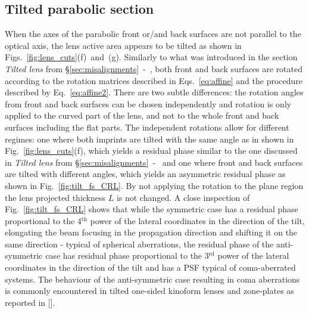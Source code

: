 \begin{refsection}
\subsection{Tilted parabolic section}

When the axes of the parabolic front or/and back surfaces are not parallel to the optical axis, the lens active area appears to be tilted as shown in Figs.~\ref{fig:lens_cuts}(f)~and~(g). Similarly to what was introduced in the section \textit{Tilted lens} from \S\ref{sec:misalignments}~-~\textit{}, both front and back surfaces are rotated according to the rotation matrices described in Eqs.~\ref{eq:affine} and the procedure described by Eq.~\ref{eq:affine2}. There are two subtle differences: the rotation angles from front and back surfaces can be chosen independently and rotation is only applied to the curved part of the lens, and not to the whole front and back surfaces including the flat parts. The independent rotations allow for different regimes: one where both imprints are tilted with the same angle as in shown in Fig.~\ref{fig:lens_cuts}(f), which yields a residual phase similar to the one discussed in \textit{Tilted lens} from \S\ref{sec:misalignments}~-~\textit{} and one where front and back surfaces are tilted with different angles, which yields an asymmetric residual phase as shown in Fig.~\ref{fig:tilt_fs_CRL}. By not applying the rotation to the plane region the lens projected thickness $L$ is not changed. A close inspection of Fig.~\ref{fig:tilt_fs_CRL} shows that while the symmetric case has a residual phase proportional to the 4$^{\text{th}}$ power of the lateral coordinates in the direction of the tilt, elongating the beam focusing in the propagation direction and shifting it on the same direction - typical of spherical aberrations, the residual phase of the anti-symmetric case has residual phase proportional to the 3$^{\text{rd}}$ power of the lateral coordinates in the direction of the tilt and has a PSF typical of coma-aberrated systems. The behaviour of the anti-symmetric case resulting in coma aberrations is commonly encountered in tilted one-sided kinoform lenses and zone-plates as reported in [\cite{Guizar-Sicairos2011,Ali2020}]. 


\end{refsection}
